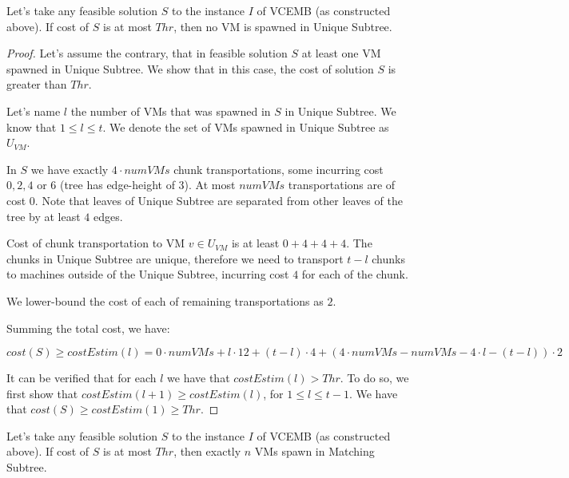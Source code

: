 \begin{theorem}
  Let's take any feasible solution $S$ to the instance $I$ of VCEMB
  (as constructed above). If cost of $S$ is at most $Thr$, then no VM
  is spawned in Unique Subtree.
  \label{th:no-unique}
\end{theorem}

\begin{proof}
  Let's assume the contrary, that in feasible solution $S$ at least
  one VM spawned in Unique Subtree. We show that in this case, the
  cost of solution $S$ is greater than $Thr$.

  Let's name $l$ the number of VMs that was spawned in $S$ in Unique
  Subtree. We know that $1 \leq l \leq t$. We denote the set of VMs
  spawned in Unique Subtree as $U_{VM}$.

  In $S$ we have exactly $4 \cdot numVMs$ chunk transportations, some
  incurring cost $0, 2, 4$ or $6$ (tree has edge-height of $3$). At
  most $numVMs$ transportations are of cost $0$. Note that leaves of
  Unique Subtree are separated from other leaves of the tree by at
  least $4$ edges.

  Cost of chunk transportation to VM $v \in U_{VM}$ is at least
  $0 + 4 + 4 + 4$. The chunks in Unique Subtree are unique, therefore
  we need to transport $t - l$ chunks to machines outside of the
  Unique Subtree, incurring cost $4$ for each of the chunk.

  We lower-bound the cost of each of remaining transportations as $2$.

  Summing the total cost, we have:

  $cost(S) \geq costEstim(l) = 0 \cdot numVMs + l \cdot 12 +
  (t-l)\cdot 4 + (4\cdot numVMs - numVMs - 4\cdot l - (t-l))\cdot 2$

  It can be verified that for each $l$ we have that
  $costEstim(l) > Thr$. To do so, we first show that
  $costEstim(l+1) \geq costEstim(l)$, for $1\leq l \leq t-1$. We have
  that $cost(S) \geq costEstim(1) \geq Thr$.
\end{proof}

\begin{theorem}
  Let's take any feasible solution $S$ to the instance $I$ of VCEMB
  (as constructed above). If cost of $S$ is at most $Thr$, then
  exactly $n$ VMs spawn in Matching Subtree.
  \label{th:np-balance}
\end{theorem}

